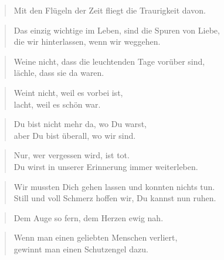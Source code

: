 \documentclass[ngerman,a4paper,11pt]{scrreprt}
\begin{document}
\begin{verse}
Mit den Flügeln der Zeit fliegt die Traurigkeit davon. \\
\end{verse}

\begin{verse}
Das einzig wichtige im Leben, sind die Spuren von Liebe, \\
die wir hinterlassen, wenn wir weggehen. \\
\end{verse}

\begin{verse}
Weine nicht, dass die leuchtenden Tage vorüber sind, \\
lächle, dass sie da waren. \\
\end{verse}

\begin{verse}
Weint nicht, weil es vorbei ist, \\
lacht, weil es schön war. \\
\end{verse}

\begin{verse}
Du bist nicht mehr da, wo Du warst, \\
aber Du bist überall, wo wir sind. \\
\end{verse}

\begin{verse}
Nur, wer vergessen wird, ist tot. \\
Du wirst in unserer Erinnerung immer weiterleben. \\
\end{verse}

\begin{verse}
Wir mussten Dich gehen lassen und konnten nichts tun. \\
Still und voll Schmerz hoffen wir, Du kannst nun ruhen. \\
\end{verse}

\begin{verse}
Dem Auge so fern, dem Herzen ewig nah. \\
\end{verse}

\begin{verse}
Wenn man einen geliebten Menschen verliert, \\
gewinnt man einen Schutzengel dazu. \\
\end{verse}
\end{document}
